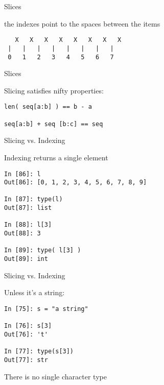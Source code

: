 \documentclass{beamer}
\begin{document}
\begin{frame}[fragile]{Slices}

{\Large the indexes point to the spaces between the items}

\vfill
\begin{verbatim}
   X   X   X   X   X   X   X   X
 |   |   |   |   |   |   |   | 
 0   1   2   3   4   5   6   7
\end{verbatim}

\end{frame}

\begin{frame}[fragile]{Slices}

{\Large Slicing satisfies nifty properties:

\vfill
\begin{verbatim}
len( seq[a:b] ) == b - a

seq[a:b] + seq [b:c] == seq

\end{verbatim}

}

\end{frame}

\begin{frame}[fragile]{Slicing vs. Indexing}

{\Large Indexing returns a single element}

\begin{verbatim}
In [86]: l
Out[86]: [0, 1, 2, 3, 4, 5, 6, 7, 8, 9]

In [87]: type(l)
Out[87]: list

In [88]: l[3]
Out[88]: 3

In [89]: type( l[3] )
Out[89]: int
\end{verbatim}
\end{frame}

\begin{frame}[fragile]{Slicing vs. Indexing}

{\Large Unless it's a string:}

\begin{verbatim}
In [75]: s = "a string"

In [76]: s[3]
Out[76]: 't'

In [77]: type(s[3])
Out[77]: str
\end{verbatim}

\vfill
There is no single character type

\end{frame}
\end{document}
